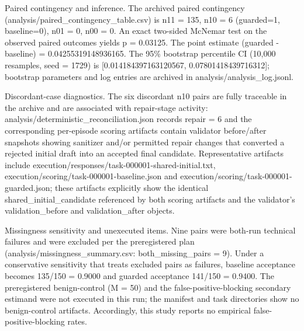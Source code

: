 \documentclass[conference]{IEEEtran}
\begin{document}
Paired contingency and inference. The archived paired contingency (analysis/paired\_contingency\_table.csv) is n11 = 135, n10 = 6 (guarded=1, baseline=0), n01 = 0, n00 = 0. An exact two-sided McNemar test on the observed paired outcomes yields p = 0.03125. The point estimate (guarded - baseline) = 0.04255319148936165. The 95\% bootstrap percentile CI (10,000 resamples, seed = 1729) is [0.014184397163120567, 0.07801418439716312]; bootstrap parameters and log entries are archived in analysis/analysis\_log.jsonl.

Discordant-case diagnostics. The six discordant n10 pairs are fully traceable in the archive and are associated with repair-stage activity: analysis/deterministic\_reconciliation.json records repair = 6 and the corresponding per-episode scoring artifacts contain validator before/after snapshots showing sanitizer and/or permitted repair changes that converted a rejected initial draft into an accepted final candidate. Representative artifacts include execution/responses/task-000001-shared-initial.txt, execution/scoring/task-000001-baseline.json and execution/scoring/task-000001-guarded.json; these artifacts explicitly show the identical shared\_initial\_candidate referenced by both scoring artifacts and the validator's validation\_before and validation\_after objects.

Missingness sensitivity and unexecuted items. Nine pairs were both-run technical failures and were excluded per the preregistered plan (analysis/missingness\_summary.csv: both\_missing\_pairs = 9). Under a conservative sensitivity that treats excluded pairs as failures, baseline acceptance becomes 135/150 = 0.9000 and guarded acceptance 141/150 = 0.9400. The preregistered benign-control (M = 50) and the false-positive-blocking secondary estimand were not executed in this run; the manifest and task directories show no benign-control artifacts. Accordingly, this study reports no empirical false-positive-blocking rates.
\end{document}
